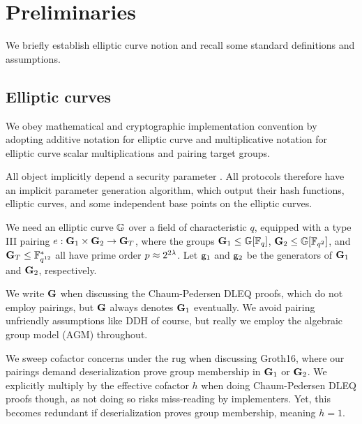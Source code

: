 
\section{Preliminaries} %
\label{sec:background}

We briefly establish elliptic curve notion and recall some standard
definitions and assumptions.



\subsection{Elliptic curves}
\label{sec:ec_background}


We obey mathematical and cryptographic implementation convention by 
adopting additive notation for elliptic curve and multiplicative notation
for elliptic curve scalar multiplications and pairing target groups.

All object implicitly depend a security parameter \secparam.
All protocols therefore have an implicit parameter generation algorithm,
which output their hash functions, elliptic curves, and
 some independent base points on the elliptic curves.

We need an elliptic curve ${\mathbb{G}}$ over a field of characteristic $q$,
equipped with a type III pairing $e : {\mathbf{G}}_1 \times {\mathbf{G}}_2 \to {\mathbf{G}}_T$,
where the groups  ${\mathbf{G}}_1 \le {\mathbb{G}}[\mathbb{F}_q]$, ${\mathbf{G}}_2 \le {\mathbb{G}}[\mathbb{F}_{q^2}]$, and
${\mathbf{G}}_T \le \mathbb{F}^*_{q^{12}}$ all have prime order $p \approx 2^{2\lambda}$. 
Let $\mathsf{g}_1$ and $\mathsf{g}_2$ be the generators of ${\mathbf{G}}_1$ and ${\mathbf{G}}_2$, respectively. 

We write ${\mathbf{G}}$ when discussing the Chaum-Pedersen DLEQ proofs, which do
not employ pairings, but ${\mathbf{G}}$ always denotes ${\mathbf{G}}_1$ eventually.
We avoid pairing unfriendly assumptions like DDH of course, but really
we employ the algebraic group model (AGM) throughout.

We sweep cofactor concerns under the rug when discussing Groth16,
where our pairings demand deserialization prove group membership in ${\mathbf{G}}_1$
or ${\mathbf{G}}_2$.  We explicitly multiply by the effective cofactor $h$ when
doing Chaum-Pedersen DLEQ proofs though, as not doing so risks miss-reading
by implementers.  Yet, this becomes redundant if deserialization proves
group membership, meaning $h=1$.

